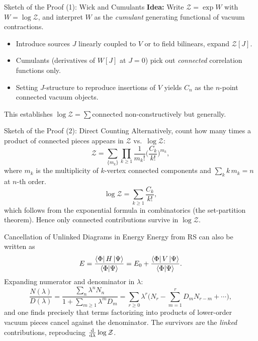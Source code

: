 \documentclass[aspectratio=169,11pt]{beamer}
\newcommand{\V}{V}
\newcommand{\braPhi}{\bra{\Phi}}
\newcommand{\Egs}{E}
\newcommand{\Z}{\mathcal{Z}}
\begin{document}
\begin{frame}{Sketch of the Proof (1): Wick and Cumulants}
\textbf{Idea:} Write $\Z=\exp W$ with $W=\log\Z$, and interpret $W$ as the \emph{cumulant} generating functional of vacuum contractions.
\begin{itemize}
  \item Introduce sources $J$ linearly coupled to $\V$ or to field bilinears, expand $\Z[J]$.
  \item Cumulants (derivatives of $W[J]$ at $J=0$) pick out \emph{connected} correlation functions only.
  \item Setting $J$-structure to reproduce insertions of $\V$ yields $C_n$ as the $n$-point connected vacuum objects.
\end{itemize}
This establishes $\log \Z = \sum \text{connected}$ non-constructively but generally.
\end{frame}

\begin{frame}{Sketch of the Proof (2): Direct Counting}
Alternatively, count how many times a product of connected pieces appears in $\Z$ vs.\ $\log\Z$:
\[
\Z = \sum_{\{m_k\}}\prod_{k\ge 1}\frac{1}{m_k!}\Big(\frac{C_k}{k!}\Big)^{m_k},
\]
where $m_k$ is the multiplicity of $k$-vertex connected components and $\sum_k k\,m_k=n$ at $n$-th order.
\[
\log\Z = \sum_{k\ge 1} \frac{C_k}{k!},
\]
which follows from the exponential formula in combinatorics (the set-partition theorem). Hence only connected contributions survive in $\log\Z$.
\end{frame}

\begin{frame}{Cancellation of Unlinked Diagrams in Energy}
Energy from RS can also be written as
\[
\Egs = \frac{\braPhi H \ket{\Psi}}{\braket{\Phi}{\Psi}}
= E_0 + \frac{\braPhi \V \ket{\Psi}}{\braket{\Phi}{\Psi}}.
\]
Expanding numerator and denominator in $\lambda$:
\[
\frac{N(\lambda)}{D(\lambda)}=\frac{\sum_n \lambda^n N_n}{1+\sum_{m\ge 1}\lambda^m D_m}
= \sum_{r\ge 0} \lambda^r \Big(N_r - \sum_{m=1}^r D_m N_{r-m} + \cdots\Big),
\]
and one finds precisely that terms factorizing into products of lower-order vacuum pieces cancel against the denominator. The survivors are the \emph{linked} contributions, reproducing $\dv{\lambda}\log\Z$.
\end{frame}
\end{document}
